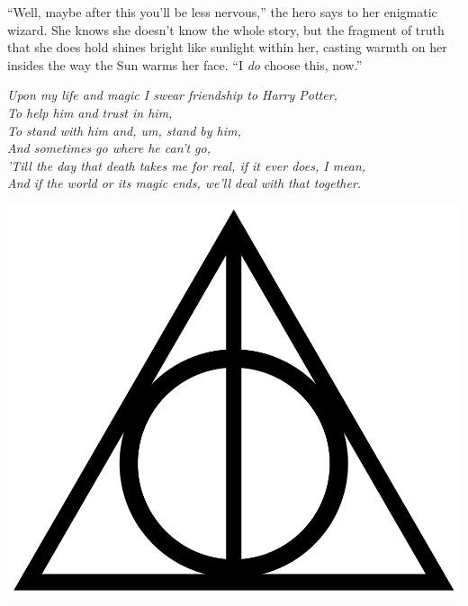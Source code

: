 “Well, maybe after this you’ll be less nervous,” the hero says to her enigmatic wizard. She knows she doesn’t know the whole story, but the fragment of truth that she does hold shines bright like sunlight within her, casting warmth on her insides the way the Sun warms her face. “I \emph{do} choose this, now.”

\noindent{}\emph{Upon my life and magic I swear friendship to Harry Potter,}\\ \emph{To help him and trust in him,}\\ \emph{To stand with him and, um, stand by him,}\\ \emph{And sometimes go where he can’t go,}\\ \emph{’Till the day that death takes me for real, if it ever does, I mean,}\\ \emph{And if the world or its magic ends, we’ll deal with that together.}

\vspace*{\fill}
{
\begin{center}
\includegraphics[scale=0.125]{Deathly_Hallows_Sign.png}
\end{center}
}
\vspace*{\fill}
\clearpage


